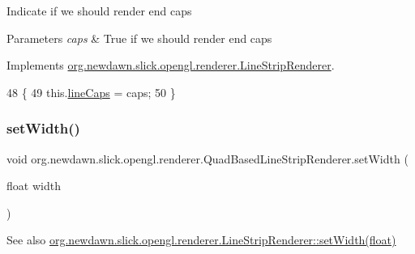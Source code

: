 Indicate if we should render end caps


\begin{DoxyParams}{Parameters}
{\em caps} & True if we should render end caps \\
\hline
\end{DoxyParams}


Implements \mbox{\hyperlink{interfaceorg_1_1newdawn_1_1slick_1_1opengl_1_1renderer_1_1_line_strip_renderer_ac2c299158c60d76e8745759dd2dc8633}{org.\+newdawn.\+slick.\+opengl.\+renderer.\+Line\+Strip\+Renderer}}.


\begin{DoxyCode}
48                                           \{
49         this.\mbox{\hyperlink{classorg_1_1newdawn_1_1slick_1_1opengl_1_1renderer_1_1_quad_based_line_strip_renderer_ace776b7bf8f22bedc9c3cb99e1603116}{lineCaps}} = caps;
50     \}
\end{DoxyCode}
\mbox{\label{classorg_1_1newdawn_1_1slick_1_1opengl_1_1renderer_1_1_quad_based_line_strip_renderer_a1ebfc1a913b6cb8763137ba710354689}} 
\subsubsection{\texorpdfstring{set\+Width()}{setWidth()}}
{\footnotesize\ttfamily void org.\+newdawn.\+slick.\+opengl.\+renderer.\+Quad\+Based\+Line\+Strip\+Renderer.\+set\+Width (\begin{DoxyParamCaption}\item[{float}]{width }\end{DoxyParamCaption})\hspace{0.3cm}{\ttfamily [inline]}}

\begin{DoxySeeAlso}{See also}
\mbox{\hyperlink{interfaceorg_1_1newdawn_1_1slick_1_1opengl_1_1renderer_1_1_line_strip_renderer_afc8159c0766c0d177b402cf311d9a7b8}{org.\+newdawn.\+slick.\+opengl.\+renderer.\+Line\+Strip\+Renderer\+::set\+Width(float)}} 
\end{DoxySeeAlso}


